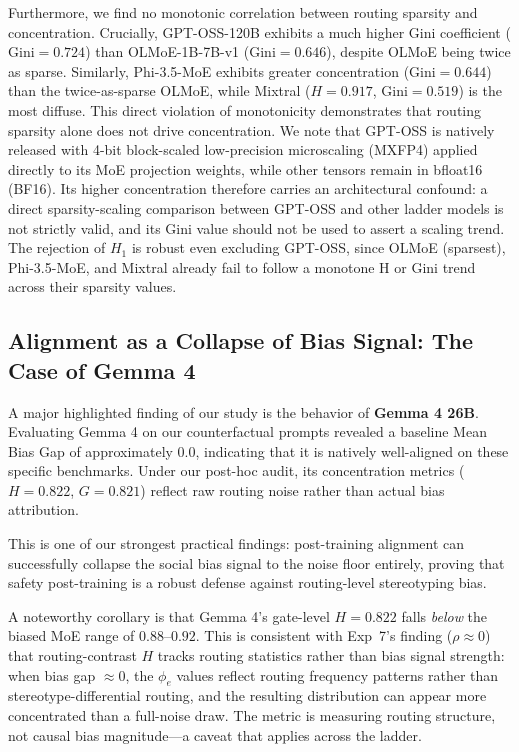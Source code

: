 \documentclass[11pt,a4paper]{article}
\begin{document}
Furthermore, we find no monotonic correlation between routing sparsity and concentration. Crucially, GPT-OSS-120B exhibits a much higher Gini coefficient ($\text{Gini} = 0.724$) than OLMoE-1B-7B-v1 ($\text{Gini} = 0.646$), despite OLMoE being twice as sparse. Similarly, Phi-3.5-MoE exhibits greater concentration ($\text{Gini} = 0.644$) than the twice-as-sparse OLMoE, while Mixtral ($H=0.917$, $\text{Gini}=0.519$) is the most diffuse. This direct violation of monotonicity demonstrates that routing sparsity alone does not drive concentration. We note that GPT-OSS is natively released with 4-bit block-scaled low-precision microscaling (MXFP4) applied directly to its MoE projection weights, while other tensors remain in bfloat16 (BF16). Its higher concentration therefore carries an architectural confound: a direct sparsity-scaling comparison between GPT-OSS and other ladder models is not strictly valid, and its Gini value should not be used to assert a scaling trend. The rejection of $H_1$ is robust even excluding GPT-OSS, since OLMoE (sparsest), Phi-3.5-MoE, and Mixtral already fail to follow a monotone H or Gini trend across their sparsity values.

\subsection{Alignment as a Collapse of Bias Signal: The Case of Gemma 4}
A major highlighted finding of our study is the behavior of \textbf{Gemma 4 26B}. Evaluating Gemma 4 on our counterfactual prompts revealed a baseline Mean Bias Gap of approximately $0.0$, indicating that it is natively well-aligned on these specific benchmarks. Under our post-hoc audit, its concentration metrics ($H=0.822$, $G=0.821$) reflect raw routing noise rather than actual bias attribution. 

This is one of our strongest practical findings: post-training alignment can successfully collapse the social bias signal to the noise floor entirely, proving that safety post-training is a robust defense against routing-level stereotyping bias.

A noteworthy corollary is that Gemma 4's gate-level $H = 0.822$ falls \textit{below} the biased MoE range of $0.88$--$0.92$. This is consistent with Exp~7's finding ($\rho \approx 0$) that routing-contrast $H$ tracks routing statistics rather than bias signal strength: when bias gap $\approx 0$, the $\phi_e$ values reflect routing frequency patterns rather than stereotype-differential routing, and the resulting distribution can appear more concentrated than a full-noise draw. The metric is measuring routing structure, not causal bias magnitude—a caveat that applies across the ladder.
\end{document}

